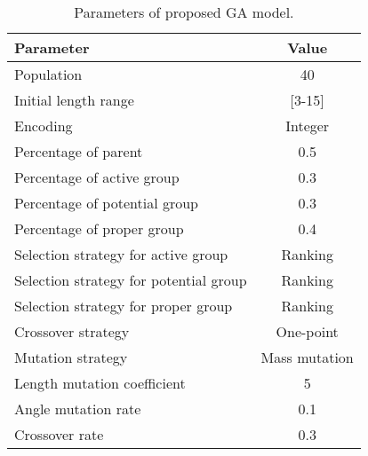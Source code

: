 \begin{table}[!b]
\centering
\caption{Parameters of proposed GA model.}
\begin{adjustbox}{width=0.45\textwidth}
\label{tab:ga}
\begin{tabular}{lc}
\toprule
Parameter								&  Value  \\
\midrule
Population                              & 40        \\
Initial length range					& [3-15]    \\
Encoding								& Integer   \\
Percentage of parent                    & 0.5   \\
Percentage of active group				& 0.3   \\
Percentage of potential group			& 0.3   \\
Percentage of proper group				& 0.4   \\
Selection strategy for  active group	& Ranking   \\
Selection strategy for potential group	& Ranking   \\
Selection strategy for proper group	    & Ranking   \\
Crossover strategy			    		& One-point \\
Mutation strategy			    		& Mass mutation \\
Length mutation coefficient             & 5 \\
Angle mutation rate                     & 0.1 \\
Crossover rate                          & 0.3 \\
\bottomrule
\end{tabular}
\end{adjustbox}
\end{table}
